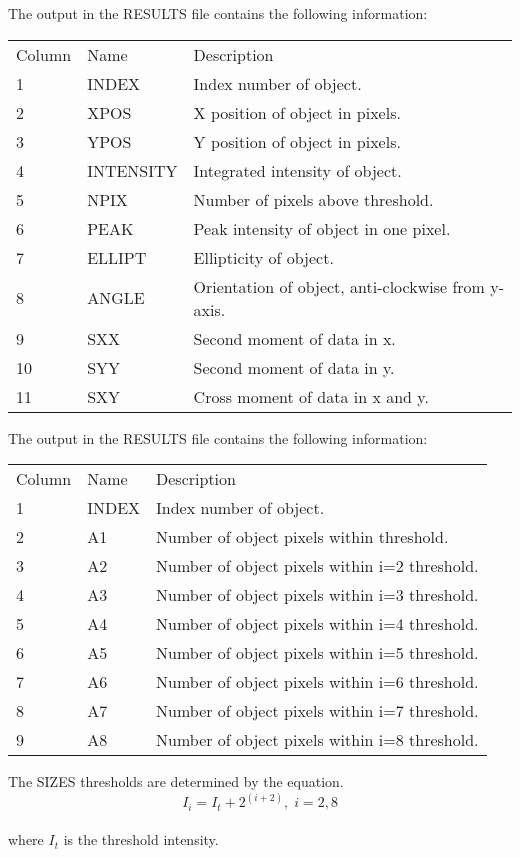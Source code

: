 {{{         \sstitem
         The output in the RESULTS file contains the following
         information:
\begin{center}
\begin{tabular}{lll}
 Column & Name  & Description \\
 1 & INDEX & Index number of object.\\
 2 & XPOS & X position of object in pixels.\\
 3 & YPOS & Y position of object in pixels.\\
 4 & INTENSITY & Integrated intensity of object.\\
 5 & NPIX & Number of pixels above threshold.\\
 6 & PEAK & Peak intensity of object in one pixel.\\
 7 & ELLIPT & Ellipticity of object.\\
 8 & ANGLE & Orientation of object, anti-clockwise from y-axis.\\
 9 & SXX & Second moment of data in x.\\
 10 & SYY & Second moment of data in y.\\
 11 & SXY & Cross moment of data in x and y.\\
\end{tabular}
\end{center}

         \sstitem
         The output in the RESULTS file contains the following
         information:
\begin{center}
\begin{tabular}{lll}
Column & Name  & Description \\
 1 & INDEX & Index number of object.\\
 2 & A1 & Number of object pixels within threshold.\\
 3 & A2 & Number of object pixels within i=2 threshold.\\
 4 & A3 & Number of object pixels within i=3 threshold.\\
 5 & A4 & Number of object pixels within i=4 threshold.\\
 6 & A5 & Number of object pixels within i=5 threshold.\\
 7 & A6 & Number of object pixels within i=6 threshold.\\
 8 & A7 & Number of object pixels within i=7 threshold.\\
 9 & A8 & Number of object pixels within i=8 threshold.\\
\end{tabular}
\end{center}

      The SIZES thresholds are determined by the equation. \\
      \begin{displaymath}
         I_{i} = I_{t} + 2^{(i+2)},\; i=2,8
      \end{displaymath} \\
      where $I_{t}$ is the threshold intensity.

      }
   }
}
